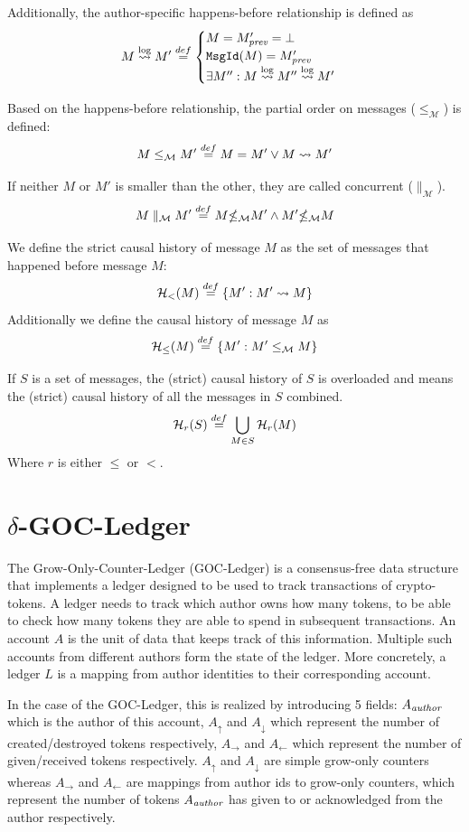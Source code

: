 Additionally, the author-specific happens-before relationship is defined as
\begin{equation}
    M \stackrel{\text{log}}{\rightsquigarrow} M' \stackrel{def}{=} \begin{cases}
        M = M'_\emph{prev} = \bot \\
        \texttt{MsgId}(M) = M'_\emph{prev} \\
        \exists M'' : M \stackrel{\text{log}}{\rightsquigarrow} M'' \stackrel{\text{log}}{\rightsquigarrow} M'
    \end{cases}
    \label{eqn:happens-before-author}
\end{equation}


Based on the happens-before relationship, the partial order on messages ($\le_\mathcal{M}$) is defined:
\[
    M \le_\mathcal{M} M' \stackrel{def}{=} M = M' \lor M \rightsquigarrow M'
\]

If neither $M$ or $M'$ is smaller than the other, they are called concurrent ($\parallel_\mathcal{M}$).
\[
    M \parallel_\mathcal{M} M' \stackrel{def}{=} M {\nleq_\mathcal{M}} M' \land M' {\nleq_\mathcal{M}} M
\]

We define the strict causal history of message $M$ as the set of messages that happened before message $M$:
\[
    \mathcal H_<(M) \stackrel{def}{=} \{M' : M' \rightsquigarrow M\}
\]
Additionally we define the causal history of message $M$ as
\[
    \mathcal H_\le(M) \stackrel{def}{=} \{M' : M' \le_\mathcal{M} M\}
\]

If $S$ is a set of messages, the (strict) causal history of $S$ is overloaded and means the (strict) causal history of all the messages in $S$ combined.
\[
    \mathcal H_r(S) \stackrel{def}{=} \bigcup_{M \in S}\mathcal H_r(M)
\]
Where $r$ is either $\le$ or $<$.


\section{\(\delta\)-GOC-Ledger}

The Grow-Only-Counter-Ledger (GOC-Ledger) is a consensus-free data structure that implements a ledger designed to be used to track transactions of crypto-tokens. A ledger needs to track which author owns how many tokens, to be able to check how many tokens they are able to spend in subsequent transactions. An account $A$ is the unit of data that keeps track of this information. Multiple such accounts from different authors form the state of the ledger. More concretely, a ledger $L$ is a mapping from author identities to their corresponding account.

In the case of the GOC-Ledger, this is realized by introducing 5 fields: $A_\emph{author}$ which is the author of this account, $A_\uparrow$ and $A_\downarrow$ which represent the number of created/destroyed tokens respectively, $A_\rightarrow$ and $A_\leftarrow$ which represent the number of given/received tokens respectively. $A_\uparrow$ and $A_\downarrow$ are simple grow-only counters whereas $A_\rightarrow$ and $A_\leftarrow$ are mappings from author ids to grow-only counters, which represent the number of tokens $A_\emph{author}$ has given to or acknowledged from the author respectively.

